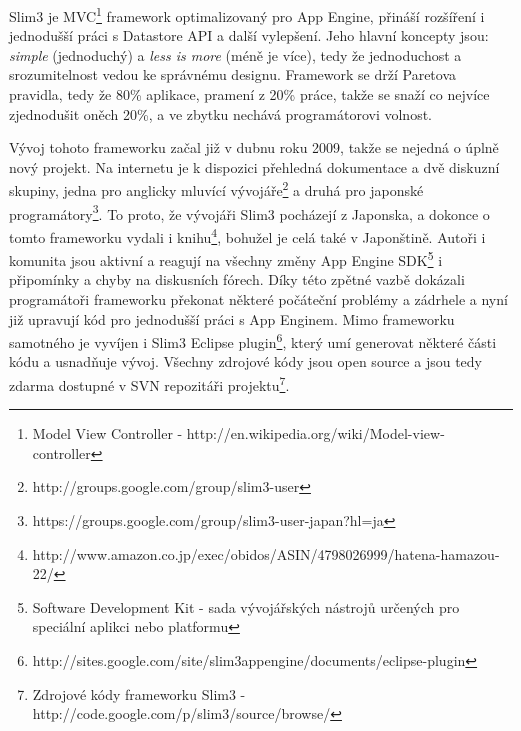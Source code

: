 Slim3 je MVC\footnote{Model View Controller - http://en.wikipedia.org/wiki/Model-view-controller}
framework optimalizovaný pro App Engine, přináší rozšíření i jednodušší práci s Datastore API a další vylepšení. Jeho hlavní koncepty jsou: \emph{simple} (jednoduchý) a \emph{less is more} (méně je více), tedy že jednoduchost a srozumitelnost vedou ke správnému designu. Framework se drží Paretova pravidla, tedy že 80\% aplikace, pramení z 20\% práce, takže se snaží co nejvíce zjednodušit oněch 20\%, a ve zbytku nechává programátorovi volnost.

Vývoj tohoto frameworku začal  již v dubnu roku 2009, takže se nejedná o úplně nový projekt. Na internetu je k dispozici přehledná dokumentace a dvě diskuzní skupiny, jedna pro anglicky mluvící vývojáře\footnote{http://groups.google.com/group/slim3-user} a druhá pro japonské programátory\footnote{https://groups.google.com/group/slim3-user-japan?hl=ja}. To proto, že vývojáři Slim3 pocházejí z Japonska, a dokonce o tomto frameworku vydali i knihu\footnote{http://www.amazon.co.jp/exec/obidos/ASIN/4798026999/hatena-hamazou-22/}, bohužel je celá také v Japonštině. Autoři i komunita jsou aktivní a reagují na všechny změny App Engine SDK\footnote{Software Development Kit - sada vývojářských nástrojů určených pro speciální aplikci nebo platformu} i připomínky a chyby na diskusních fórech. Díky této zpětné vazbě dokázali programátoři frameworku překonat některé počáteční problémy a zádrhele a nyní již upravují kód pro jednodušší práci s App Enginem. Mimo frameworku samotného je vyvíjen i Slim3 Eclipse plugin\footnote{http://sites.google.com/site/slim3appengine/documents/eclipse-plugin}, který umí generovat některé části kódu a usnadňuje vývoj. Všechny zdrojové kódy jsou open source a jsou tedy zdarma dostupné v SVN repozitáři projektu\footnote{Zdrojové kódy frameworku Slim3 -http://code.google.com/p/slim3/source/browse/}.

